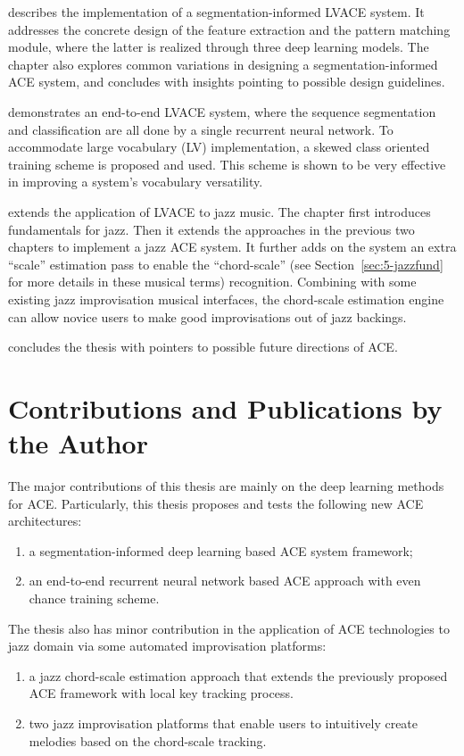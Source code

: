  describes the implementation of a segmentation-informed LVACE system. It addresses the concrete design of the feature extraction and the pattern matching module, where the latter is realized through three deep learning models. The chapter also explores common variations in designing a segmentation-informed ACE system, and concludes with insights pointing to possible design guidelines.

 demonstrates an end-to-end LVACE system, where the sequence segmentation and classification are all done by a single recurrent neural network. To accommodate large vocabulary (LV) implementation, a skewed class oriented training scheme is proposed and used. This scheme is shown to be very effective in improving a system's vocabulary versatility.

 extends the application of LVACE to jazz music. The chapter first introduces fundamentals for jazz. Then it extends the approaches in the previous two chapters to implement a jazz ACE system. It further adds on the system an extra ``scale'' estimation pass to enable the ``chord-scale'' (see Section~\ref{sec:5-jazzfund} for more details in these musical terms) recognition. Combining with some existing jazz improvisation musical interfaces, the chord-scale estimation engine can allow novice users to make good improvisations out of jazz backings.

 concludes the thesis with pointers to possible future directions of ACE.


\section{Contributions and Publications by the Author} \label{sec:1-contribution}
The major contributions of this thesis are mainly on the deep learning methods for ACE. Particularly, this thesis proposes and tests the following new ACE architectures:
\begin{enumerate}
\item a segmentation-informed deep learning based ACE system framework;
\item an end-to-end recurrent neural network based ACE approach with even chance training scheme.
\end{enumerate}

The thesis also has minor contribution in the application of ACE technologies to jazz domain via some automated improvisation platforms:
\begin{enumerate}
\item a jazz chord-scale estimation approach that extends the previously proposed ACE framework with local key tracking process.
\item two jazz improvisation platforms that enable users to intuitively create melodies based on the chord-scale tracking.
\end{enumerate}

